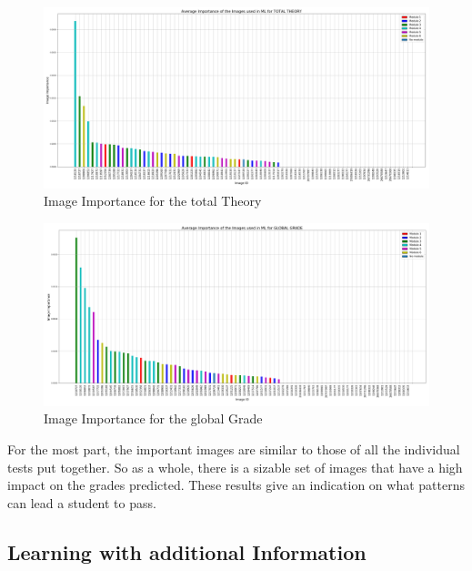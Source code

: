 \documentclass[a4paper,11pt]{report}
\numberwithin{figure}{chapter} %
\begin{document}
      \begin{figure}[H]
      \centering
      \includegraphics[width=.99\linewidth]{plots/im_importance_TOTAL_THEORY_2018-05-02_23_31_57.png}
      \caption{Image Importance for the total Theory}
      \label{fig:im_tot2}
      \end{figure}

      \begin{figure}[H]
      \centering
      \includegraphics[width=.99\linewidth]{plots/im_importance_GLOBAL_GRADE_2018-05-02_20_56_13.png}
      \caption{Image Importance for the global Grade}
      \label{fig:im_tot3}
      \end{figure}

    For the most part, the important images are similar to those of all the individual tests put together.
    So as a whole, there is a sizable set of images that have a high impact on the grades predicted.
    These results give an indication on what patterns can lead a student to pass.

    \subsection{Learning with additional Information}
\end{document}
